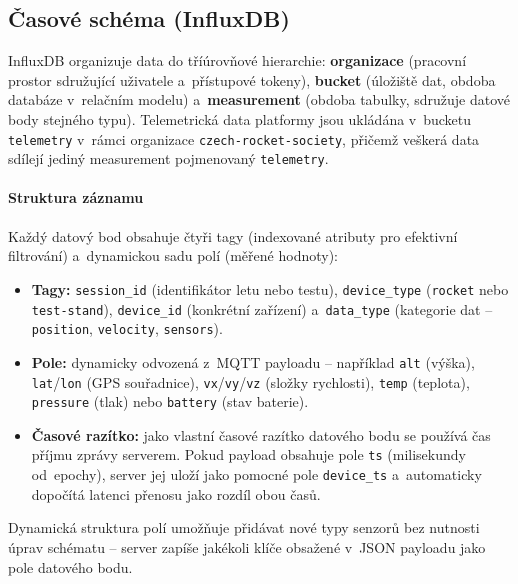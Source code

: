 \subsection{Časové schéma (InfluxDB)}

InfluxDB organizuje data do tříúrovňové hierarchie: \textbf{organizace} (pracovní prostor sdružující uživatele a~přístupové tokeny), \textbf{bucket} (úložiště dat, obdoba databáze v~relačním modelu) a~\textbf{measurement} (obdoba tabulky, sdružuje datové body stejného typu). Telemetrická data platformy jsou ukládána v~bucketu \texttt{telemetry} v~rámci organizace \texttt{czech-rocket-society}, přičemž veškerá data sdílejí jediný measurement pojmenovaný \texttt{telemetry}.

\paragraph{Struktura záznamu}

Každý datový bod obsahuje čtyři tagy (indexované atributy pro efektivní filtrování) a~dynamickou sadu polí (měřené hodnoty):

\begin{sloppypar}
\begin{itemize}
    \item \textbf{Tagy:} \texttt{session\-\_id} (identifikátor letu nebo testu), \texttt{device\-\_type} (\texttt{rocket} nebo \texttt{test-stand}), \texttt{device\-\_id} (konkrétní zařízení) a~\texttt{data\-\_type} (kategorie dat -- \texttt{position}, \texttt{velocity}, \texttt{sensors}).
    \item \textbf{Pole:} dynamicky odvozená z~MQTT payloadu -- například \texttt{alt} (výška), \texttt{lat}/\texttt{lon} (GPS souřadnice), \texttt{vx}/\texttt{vy}/\texttt{vz} (složky rychlosti), \texttt{temp} (teplota), \texttt{pressure} (tlak) nebo \texttt{battery} (stav baterie).
    \item \textbf{Časové razítko:} jako vlastní časové razítko datového bodu se používá čas příjmu zprávy serverem. Pokud payload obsahuje pole \texttt{ts} (milisekundy od~epochy), server jej uloží jako pomocné pole \texttt{device\_ts} a~automaticky dopočítá latenci přenosu jako rozdíl obou časů.
\end{itemize}
\end{sloppypar}

Dynamická struktura polí umožňuje přidávat nové typy senzorů bez nutnosti úprav schématu -- server zapíše jakékoli klíče obsažené v~JSON payloadu jako pole datového bodu.

